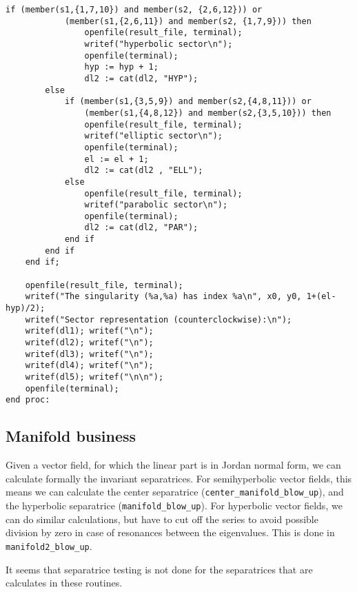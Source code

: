 \documentclass[a4paper,10pt]{article}
\begin{document}
\begin{lstlisting}[name=blowup]
        if (member(s1,{1,7,10}) and member(s2, {2,6,12})) or
            (member(s1,{2,6,11}) and member(s2, {1,7,9})) then
                openfile(result_file, terminal);
                writef("hyperbolic sector\n");
                openfile(terminal);
                hyp := hyp + 1;
                dl2 := cat(dl2, "HYP");
        else
            if (member(s1,{3,5,9}) and member(s2,{4,8,11})) or
                (member(s1,{4,8,12}) and member(s2,{3,5,10})) then
                openfile(result_file, terminal);
                writef("elliptic sector\n");
                openfile(terminal);
                el := el + 1;
                dl2 := cat(dl2 , "ELL");
            else
                openfile(result_file, terminal);
                writef("parabolic sector\n");
                openfile(terminal);
                dl2 := cat(dl2, "PAR");
            end if
        end if
    end if;

    openfile(result_file, terminal);
    writef("The singularity (%a,%a) has index %a\n", x0, y0, 1+(el-hyp)/2);
    writef("Sector representation (counterclockwise):\n");
    writef(dl1); writef("\n");
    writef(dl2); writef("\n");
    writef(dl3); writef("\n");
    writef(dl4); writef("\n");
    writef(dl5); writef("\n\n");
    openfile(terminal);
end proc:
\end{lstlisting}

\subsection{Manifold business}

Given a vector field, for which the linear part is in Jordan normal form, we can calculate formally the invariant
separatrices.  For semihyperbolic vector fields, this means we can calculate the center separatrice
(\verb+center_manifold_blow_up+), and the hyperbolic separatrice (\verb+manifold_blow_up+).  For hyperbolic
vector fields, we can do similar calculations, but have to cut off the series to avoid possible division by zero
in case of resonances between the eigenvalues. This is done in \verb+manifold2_blow_up+.
\smallskip

It seems that separatrice testing is not done for the separatrices that are calculates in these routines.
\end{document}
